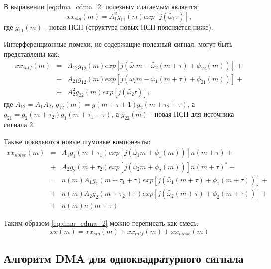В выражении \ref{eq:dma_cdma_2} полезным слагаемым является:
\begin{equation}
	\label{eq:dma_cdma_3}
	xx_{sig}(m) = A^2_1 g_{11}(m) exp[j (\tilde {\omega_1} \tau)],
\end{equation}
где ${g_{11}(m)}$ - новая ПСП (структура новых ПСП поясняется ниже). 

Интерференционные помехи, не содержащие полезный сигнал, могут быть представлены как:
\begin{eqnarray}
	\label{eq:dma_cdma_4}
	xx_{intf}(m) & = & A_{12} g_{12}(m) exp \left[ j \left( \tilde{\omega_1} m - \tilde{\omega_2}(m + \tau) + \phi_{12} (m) \right) \right] + \nonumber \\
		& + & A_{21} g_{12}(m) exp \left[ j \left( \tilde{\omega_2} m - \tilde{\omega_1}(m + \tau) + \phi_{21} (m) \right) \right] + \nonumber \\
		& + & A^2_2 g_{22}(m) exp[j (\tilde {\omega_2} \tau)],
\end{eqnarray}
где ${A_{12}=A_1 A_2}$, ${g_{12}(m)=g(m+\tau+1)g_2(m+\tau_2+\tau)}$, а ${g_{21} = g_2(m+\tau_2)g_1(m+\tau_1+\tau)}$, а ${g_{22}(m)}$ - новая ПСП для источника сигнала 2.

Также появляются новые шумовые компоненты:
\begin{eqnarray}
	\label{eq:dma_cdma_5}
	xx_{noise}(m) & = & A_{1} g_{1}(m + \tau_1) exp \left[ j \left( \tilde{\omega_1} m + \phi_{1} (m) \right) \right] n(m + \tau) + \nonumber \\
		& + & A_{2} g_{2}(m + \tau_2) exp \left[ j \left( \tilde{\omega_2} m + \phi_{2} (m) \right) \right] n(m + \tau)^* + \nonumber \\
		& = & n(m)A_{1} g_{1}(m + \tau_1 + \tau) exp \left[ j \left( \tilde{\omega_1} (m + \tau) + \phi_{1} (m + \tau) \right) \right] + \nonumber \\
		& + & n(m)A_{2} g_{2}(m + \tau_2 + \tau) exp \left[ j \left( \tilde{\omega_2} (m + \tau) + \phi_{2} (m + \tau) \right) \right] + \nonumber \\
		& + & n(m)n(m+\tau)
\end{eqnarray}

Таким образом \ref{eq:dma_cdma_2} можно переписать как смесь:
\begin{equation}
	\label{eq:dma_cdma_6}
	xx(m) = xx_{sig}(m) + xx_{intf}(m) + xx_{noise}(m)
\end{equation}

\subsection{Алгоритм DMA для одноквадратурного сигнала}
\label{sec1:dma_real}

